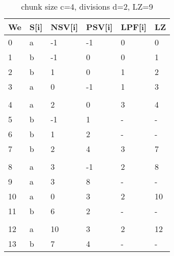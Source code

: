 \begin{table}[h]
\centering
\begin{tabular}{@{}llllll@{}}
\toprule
We  & S{[}i{]} & NSV{[}i{]} & PSV{[}i{]} & LPF{[}i{]} & LZ \\ \midrule
0  & a        & -1         & -1         & 0          & 0  \\
1  & b        & -1         & 0          & 0          & 1  \\
2  & b        & 1          & 0          & 1          & 2  \\
3  & a        & 0          & -1         & 1          & 3  \\
   &          &            &            &            &    \\
4  & a        & 2          & 0          & 3          & 4  \\
5  & b        & -1         & 1          & -          & -  \\
6  & b        & 1          & 2          & -          & -  \\
7  & b        & 2          & 4          & 3          & 7  \\
   &          &            &            &            &    \\
8  & a        & 3          & -1         & 2          & 8  \\
9  & a        & 3          & 8          & -          & -  \\
10 & a        & 0          & 3          & 2          & 10 \\
11 & b        & 6          & 2          & -          & -  \\
   &          &            &            &            &    \\
12 & a        & 10         & 3          & 2          & 12 \\
13 & b        & 7          & 4          & -          & -  \\ \bottomrule
\end{tabular}
\caption{chunk size c=4, divisions d=2, LZ=9}
\label{tab:example4}
\end{table}


